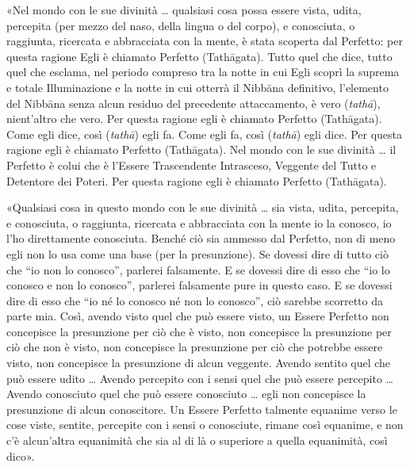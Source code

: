 %
«Nel mondo con le sue divinità … qualsiasi cosa possa essere vista, udita,
percepita (per mezzo del naso, della lingua o del corpo), e conosciuta, o
raggiunta, ricercata e abbracciata con la mente, è stata scoperta dal Perfetto:
per questa ragione Egli è chiamato Perfetto (Tathāgata). Tutto quel che dice,
tutto quel che esclama, nel periodo compreso tra la notte in cui Egli scoprì la
suprema e totale Illuminazione e la notte in cui otterrà il Nibbāna definitivo,
l’elemento del Nibbāna senza alcun residuo del precedente attaccamento, è vero
(\emph{tathā}), nient’altro che vero. Per questa ragione egli è chiamato
Perfetto (Tathāgata). Come egli dice, così (\emph{tathā}) egli fa. Come egli fa,
così (\emph{tathā}) egli dice. Per questa ragione egli è chiamato Perfetto
(Tathāgata). Nel mondo con le sue divinità … il Perfetto è colui che è l’Essere
Trascendente Intrasceso, Veggente del Tutto e Detentore dei Poteri. Per questa
ragione egli è chiamato Perfetto (Tathāgata).


«Qualsiasi cosa in questo mondo con le sue divinità … sia vista, udita,
percepita, e conosciuta, o raggiunta, ricercata e abbracciata con la mente io la
conosco, io l’ho direttamente conosciuta. Benché ciò sia ammesso dal Perfetto,
non di meno egli non lo usa come una base (per la presunzione). Se dovessi dire
di tutto ciò che “io non lo conosco”, parlerei falsamente. E se dovessi dire di
esso che “io lo conosco e non lo conosco”, parlerei falsamente pure in questo
caso. E se dovessi dire di esso che “io né lo conosco né non lo conosco”, ciò
sarebbe scorretto da parte mia. Così, avendo visto quel che può essere visto, un
Essere Perfetto non concepisce la presunzione
per ciò che è visto, non concepisce la presunzione per ciò che non è visto, non
concepisce la presunzione per ciò che potrebbe essere visto, non concepisce la
presunzione di alcun veggente. Avendo sentito quel che può essere udito … Avendo
percepito con i sensi quel che può essere percepito … Avendo conosciuto quel che
può essere conosciuto … egli non concepisce la presunzione di alcun conoscitore.
Un Essere Perfetto talmente equanime verso le cose viste, sentite, percepite con
i sensi o conosciute, rimane così equanime, e non c’è alcun’altra equanimità che
sia al di là o superiore a quella equanimità, così dico».

